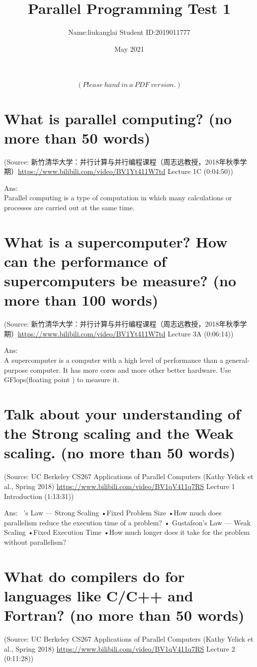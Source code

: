 \documentclass{article}
\title{Parallel Programming Test 1}
\author{Name:liukanglai  \qquad Student ID:2019011777}
\date{May 2021}
\begin{document}
\maketitle
$$(Please\ hand\ in\ a\ PDF\ version.)$$

\section{What is parallel computing? (no more than 50 words)}
(Source: 新竹清华大学：并行计算与并行编程课程（周志远教授，2018年秋季学期）\url{https://www.bilibili.com/video/BV1Yt411W7td} Lecture 1C (0:04:50))

Ans:%
~\\ Parallel computing is a type of computation in which many calculations or processes are carried out at the same time.

\section{What is a supercomputer? How can the performance of supercomputers be measure? (no more than 100 words)}
(Source: 新竹清华大学：并行计算与并行编程课程（周志远教授，2018年秋季学期）\url{https://www.bilibili.com/video/BV1Yt411W7td} Lecture 3A (0:06:14))

Ans:%
~\\ A supercomputer is a computer with a high level of performance than a general-purpose computer. It has more cores and more other better hardware.
Use GFlops(floating point ) to measure it.

\section{Talk about your understanding of the Strong scaling and the Weak scaling. (no more than 50 words)}
(Source: UC Berkeley CS267 Applications of Parallel Computers (Kathy Yelick et al., Spring 2018) \url{https://www.bilibili.com/video/BV1qV411q7RS} Lecture 1 Introduction (1:13:31))

Ans:%
~\Amdahl’s Law — Strong Scaling •Fixed Problem Size •How much does parallelism reduce the execution time of a problem?  • 
Gustafson’s Law — Weak Scaling
•Fixed Execution Time
•How much longer does it take for the problem without parallelism?\

\section{What do compilers do for languages like C/C++ and Fortran? (no more than 50 words)}
(Source: UC Berkeley CS267 Applications of Parallel Computers (Kathy Yelick et al., Spring 2018) \url{https://www.bilibili.com/video/BV1qV411q7RS} Lecture 2 (0:11:28))
\end{document}
